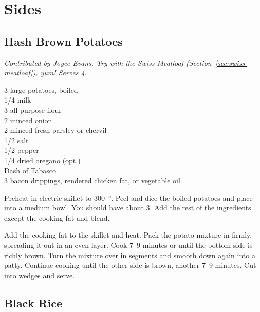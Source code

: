 \chapter{Sides}

\section{Hash Brown Potatoes}

\textit{Contributed by Joyce Evans. Try with the Swiss Meatloaf
  (Section~\ref{sec:swiss-meatloaf}), yum! Serves 4}.
\begin{ingredients}
  3 large potatoes, boiled \\
  \SI{1/4}{\cup} milk \\
  \SI{3}{\tblspoon} all-purpose flour \\
  \SI{2}{\tblspoon} minced onion \\
  \SI{2}{\tblspoon} minced fresh parsley or chervil \\
  \SI{1/2}{\teaspoon} salt \\
  \SI{1/2}{\teaspoon} pepper \\
  \SI{1/4}{\teaspoon} dried oregano (opt.) \\
  Dash of Tabasco \\
  \SI{3}{\tblspoon} bacon drippings, rendered chicken fat, or vegetable oil
\end{ingredients}
Preheat in electric skillet to \SI{300}{\degree}. Peel and dice the boiled
potatoes and place into a medium bowl. You should have about \SI{3}{\cup}. Add
the rest of the ingredients except the cooking fat and blend.

Add the cooking fat to the skillet and heat. Pack the potato mixture in
firmly, spreading it out in an even layer. Cook \numrange{7}{9} minutes or
until the bottom side is richly brown. Turn the mixture over in segments and
smooth down again into a patty. Continue cooking until the other side is
brown, another \numrange{7}{9} minutes.  Cut into wedges and serve.

\section{Black Rice}

